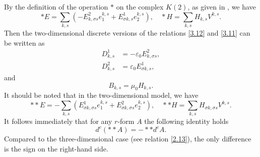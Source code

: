 \documentclass[english]{article}
\theoremstyle{plain}
\theoremstyle{definition}
\theoremstyle{remark}
\numberwithin{equation}{section}
\begin{document}
By the definition of the operation $\ast$ on the complex $K(2)$, as given in \cite{S5}, we have
\begin{equation*}\label{}
    \ast E=\sum_{k,s}\left(-E^2_{k,\sigma s}e_1^{k,s}+E^1_{\sigma k,s}e_2^{k,s}\right), \quad \ast H=\sum_{k,s}H_{k,s}V^{k,s}.
\end{equation*}
Then the  two-dimensional discrete versions of the relations \eqref{3.12} and \eqref{3.11} can be written as
\begin{align}\label{4.6}
D^1_{k,s}&= -\varepsilon_0E^2_{k,\sigma s}, \nonumber \\
D^2_{k,s}&= \varepsilon_0E^1_{\sigma k, s},
\end{align}
and
\begin{equation}\label{4.7}
     B_{k,s}= \mu_0H_{k, s}.
\end{equation}
It should be noted that in the two-dimensional model, we have
\begin{equation*}\label{}
    \ast\ast E=-\sum_{k,s}\left(E^1_{\sigma k,\sigma s}e_1^{k,s}+E^2_{\sigma k,\sigma s}e_2^{k,s}\right), \quad \ast\ast  H=\sum_{k,s}H_{\sigma k, \sigma s}V^{k,s}.
\end{equation*}
It follows immediately that for any $r$-form $A$ the following identity holds
\begin{equation}\label{4.8}
 d^c(\ast\ast A)=-\ast\ast d^c A.
\end{equation}
Compared to the three-dimensional case (see relation \eqref{2.13}), the only difference is the sign on the right-hand side.
\end{document}
